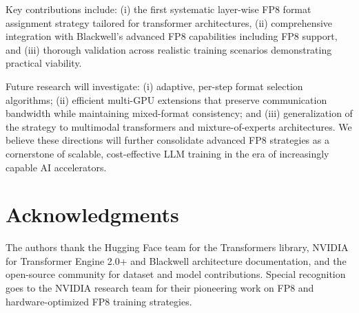 \documentclass[conference]{IEEEtran}
\begin{document}
Key contributions include: (i) the first systematic layer-wise FP8 format assignment strategy tailored for transformer architectures, (ii) comprehensive integration with Blackwell's advanced FP8 capabilities including FP8 support, and (iii) thorough validation across realistic training scenarios demonstrating practical viability.

Future research will investigate: (i) adaptive, per-step format selection algorithms; (ii) efficient multi-GPU extensions that preserve communication bandwidth while maintaining mixed-format consistency; and (iii) generalization of the strategy to multimodal transformers and mixture-of-experts architectures. We believe these directions will further consolidate advanced FP8 strategies as a cornerstone of scalable, cost-effective LLM training in the era of increasingly capable AI accelerators.

\section*{Acknowledgments}

The authors thank the Hugging Face team for the Transformers library, NVIDIA for Transformer Engine 2.0+ and Blackwell architecture documentation, and the open-source community for dataset and model contributions. Special recognition goes to the NVIDIA research team for their pioneering work on FP8 and hardware-optimized FP8 training strategies.
\end{document}
